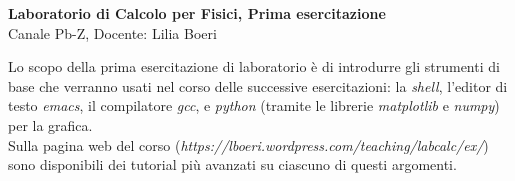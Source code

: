 \documentclass[11pt]{article}
\begin{document}
\pagestyle{empty}

\begin{center}
{\Large \bf  Laboratorio di Calcolo per Fisici, Prima esercitazione\\[2mm]}
{\large Canale Pb-Z, Docente: Lilia Boeri}
\end{center}
\vspace{4mm}

\begin{mdframed}[backgroundcolor=gray!10]
  Lo scopo della prima esercitazione di laboratorio \`e di introdurre gli strumenti di base che verranno usati nel corso delle successive esercitazioni:
  la {\em shell}, l'editor di testo {\em emacs}, il compilatore {\em gcc}, e {\em python\/} (tramite le librerie
  {\em matplotlib\/} e {\em numpy\/}) per la grafica.
\\
  Sulla pagina web del corso
  ({\em https://lboeri.wordpress.com/teaching/labcalc/ex/})
  sono disponibili dei tutorial pi\`u avanzati su ciascuno di questi argomenti.
\end{mdframed}
%
%
\end{document}
